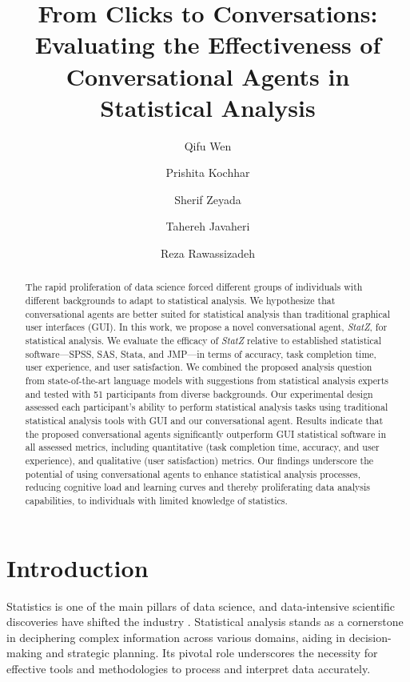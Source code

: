 \documentclass{article}
\date{}
\title{From Clicks to Conversations: Evaluating the Effectiveness of Conversational Agents in Statistical Analysis}
\author[1,*]{Qifu Wen}
\author[1]{Prishita Kochhar}
\author[1]{Sherif Zeyada}
\author[2]{Tahereh Javaheri}
\author[1]{Reza Rawassizadeh}
\affil[1]{Department of Computer Science, Boston University Metropolitan College}
\affil[2]{Health Informatics Lab, Boston University Metropolitan College}
\affil[*]{Corresponding author: \texttt{qfwen@bu.edu}}
\begin{document}
\maketitle

\begin{abstract}
The rapid proliferation of data science forced different groups of individuals with different backgrounds to adapt to statistical analysis. We hypothesize that conversational agents are better suited for statistical analysis than traditional graphical user interfaces (GUI). In this work, we propose a novel conversational agent, \emph{\textit{StatZ}}, for statistical analysis. We evaluate the efficacy of \emph{\textit{StatZ}} relative to established statistical software—SPSS, SAS, Stata, and JMP—in terms of accuracy, task completion time, user experience, and user satisfaction. We combined the proposed analysis question from state-of-the-art language models with suggestions from statistical analysis experts and tested with 51 participants from diverse backgrounds. Our experimental design assessed each participant's ability to perform statistical analysis tasks using traditional statistical analysis tools with GUI and our conversational agent. Results indicate that the proposed conversational agents significantly outperform GUI statistical software in all assessed metrics, including quantitative (task completion time, accuracy, and user experience), and qualitative (user satisfaction) metrics. Our findings underscore the potential of using conversational agents to enhance statistical analysis processes, reducing cognitive load and learning curves and thereby proliferating data analysis capabilities, to individuals with limited knowledge of statistics.
\end{abstract}




\section{Introduction} 
Statistics is one of the main pillars of data science, and data-intensive scientific discoveries have shifted the industry \cite{Hey2009, Kagermann2011}. Statistical analysis stands as a cornerstone in deciphering complex information across various domains, aiding in decision-making and strategic planning. Its pivotal role underscores the necessity for effective tools and methodologies to process and interpret data accurately.
\end{document}
